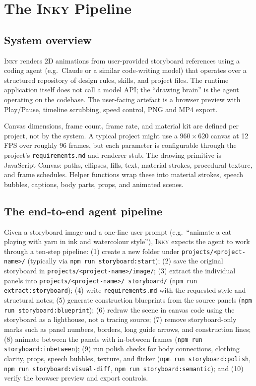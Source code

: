 \documentclass[10pt,twocolumn]{article}
\newcommand{\inky}{\textsc{Inky}}
\begin{document}
\section{The \inky{} Pipeline}

\subsection{System overview}

\inky{} renders 2D animations from user-provided storyboard
references using a coding agent (e.g.\ Claude or a similar
code-writing model) that operates over a structured repository of
design rules, skills, and project files. The runtime application
itself does not call a model API; the ``drawing brain'' is the
agent operating on the codebase. The user-facing artefact is a
browser preview with Play/Pause, timeline scrubbing, speed
control, PNG and MP4 export.

Canvas dimensions, frame count, frame rate, and material kit are
defined per project, not by the system. A typical project might
use a $960 \times 620$ canvas at 12\,FPS over roughly 96 frames,
but each parameter is configurable through the project's
\texttt{requirements.md} and renderer stub. The drawing primitive
is JavaScript Canvas: paths, ellipses, fills, text, material
strokes, procedural texture, and frame schedules. Helper
functions wrap these into material strokes, speech bubbles,
captions, body parts, props, and animated scenes.

\subsection{The end-to-end agent pipeline}

Given a storyboard image and a one-line user prompt (e.g.\
``animate a cat playing with yarn in ink and watercolour style''),
\inky{} expects the agent to work through a ten-step pipeline:
(1) create a new folder under \texttt{projects/<project-name>/}
(typically via \texttt{npm run storyboard:start});
(2) save the original storyboard in
\texttt{projects/<project-name>/image/}; (3) extract the
individual panels into \texttt{projects/<project-name>/%
storyboard/} (\texttt{npm run extract:storyboard});
(4) write \texttt{requirements.md} with the
requested style and structural notes; (5) generate construction
blueprints from the source panels (\texttt{npm run
storyboard:blueprint}); (6) redraw the scene in
canvas code using the storyboard as a lighthouse, not a tracing
source; (7) remove storyboard-only marks such as panel numbers,
borders, long guide arrows, and construction lines; (8) animate
between the panels with in-between frames (\texttt{npm run
storyboard:inbetween}); (9) run polish checks for body
connections, clothing clarity, props, speech bubbles, texture,
and flicker (\texttt{npm run storyboard:polish}, \texttt{npm run
storyboard:visual-diff}, \texttt{npm run storyboard:semantic});
and (10) verify the browser preview and export controls.
\end{document}
